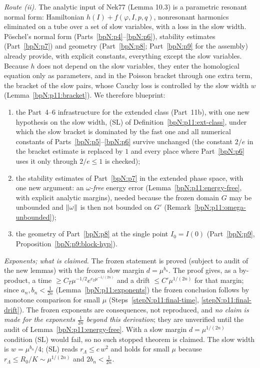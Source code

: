 \begin{remark}
\emph{Route (ii).} The analytic input of Nek77 (Lemma 10.3) is a parametric resonant normal form: Hamiltonian $h(I)+f(\varphi,I,p,q)$, nonresonant harmonics eliminated on a tube over a set of slow variables, with a loss in the slow width. P\"oschel's normal form (Parts~\ref{bpN:p4}--\ref{bpN:p6}), stability estimates (Part~\ref{bpN:p7}) and geometry (Part~\ref{bpN:p8}; Part~\ref{bpN:p9} for the assembly) already provide, with explicit constants, everything except the slow variables. Because $h$ does not depend on the slow variables, they enter the homological equation only as parameters, and in the Poisson bracket through one extra term, the bracket of the slow pairs, whose Cauchy loss is controlled by the slow width $w$ (Lemma~\ref{bpN:p11:bracket}). We therefore blueprint:
\begin{enumerate}[label=(\arabic*)]
\item the Part~4--6 infrastructure for the extended class (Part~11b), with one new hypothesis on the slow width, (SL) of Definition~\ref{bpN:p11:ext-class}, under which the slow bracket is dominated by the fast one and all numerical constants of Parts~\ref{bpN:p5}--\ref{bpN:p6} survive unchanged (the constant $2/e$ in the bracket estimate is replaced by $1$ and every place where Part~\ref{bpN:p6} uses it only through $2/e\le1$ is checked);
\item the stability estimates of Part~\ref{bpN:p7} in the extended phase space, with one new argument: an \emph{$\omega$-free} energy error (Lemma~\ref{bpN:p11:energy-free}, with explicit analytic margins), needed because the frozen domain $G$ may be unbounded and $\lVert \omega\rVert$ is then not bounded on $G'$ (Remark~\ref{bpN:p11:omega-unbounded});
\item the geometry of Part~\ref{bpN:p8} at the single point $I_0=I(0)$ (Part~\ref{bpN:p9}, Proposition~\ref{bpN:p9:block-hyp}).
\end{enumerate}
\emph{Exponents; what is claimed.} The frozen statement is proved (subject to audit of the new lemmas) with the frozen slow margin $d=\mu^{b_n}$. The proof gives, as a by-product, a time $\ge C_T\mu^{-1/2}e^{c_2\mu^{-1/(2n)}}$ and a drift $\le C'\mu^{1/(2n)}$ for that margin; since $a_n,b_n<\frac1{2n}$ (Lemma~\ref{bpN:p11:exponents}) the frozen conclusion follows by monotone comparison for small $\mu$ (Steps~\ref{stepN:p11:final-time}, \ref{stepN:p11:final-drift}). The frozen exponents are consequences, not reproduced, and \emph{no claim is made for the exponents $\frac1{2n}$ beyond this derivation}; they are unverified until the audit of Lemma~\ref{bpN:p11:energy-free}. With a slow margin $d=\mu^{1/(2n)}$ condition (SL) would fail, so no such stopped theorem is claimed. The slow width is $w=\mu^{b_n}/4$; (SL) reads $r_\Lambda\le c\,w^2$ and holds for small $\mu$ because $r_\Lambda\le R_0/K\sim\mu^{1/(2n)}$ and $2b_n<\frac1{2n}$.
\end{remark}

